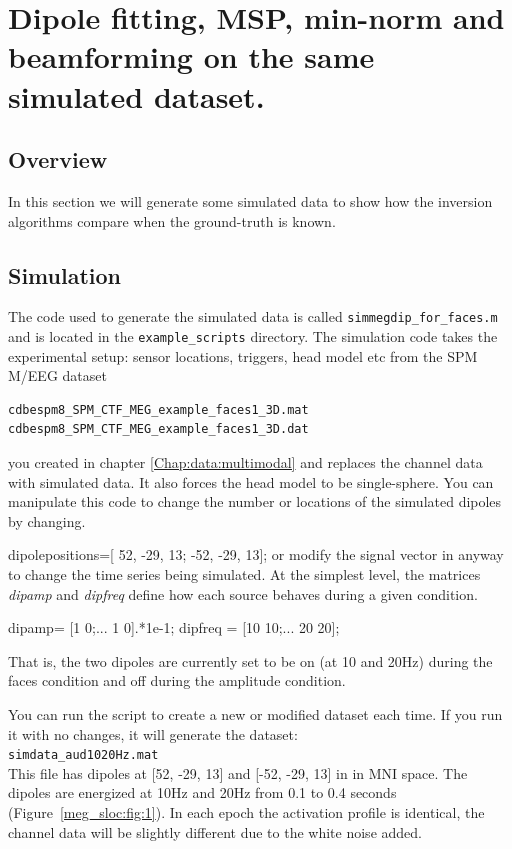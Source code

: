 \chapter{Dipole fitting, MSP, min-norm and beamforming on the same simulated dataset. \label{Chap:data:sloc}}

\section{Overview}
In this section we will generate some simulated data to show how the inversion algorithms compare when the ground-truth is known. 

\section{Simulation}
The code used to generate the simulated data is called \texttt{simmegdip_for_faces.m} and is located in the \texttt{example_scripts} directory. The simulation code takes the experimental setup: sensor locations, triggers, head model etc from the SPM M/EEG dataset

\begin{verbatim}
cdbespm8_SPM_CTF_MEG_example_faces1_3D.mat
cdbespm8_SPM_CTF_MEG_example_faces1_3D.dat
\end{verbatim}

you created in chapter \ref{Chap:data:multimodal} and replaces the channel data with simulated data. It also forces the head model to be single-sphere.
You can manipulate this code to change the number or locations of the simulated dipoles by changing.

\beginverbatim
dipolepositions=[ 52, -29, 13; -52, -29, 13]; %
\endverbatim
or modify the signal vector in anyway to change the time series being simulated. At the simplest level, the matrices \textit{dipamp} and \textit{dipfreq} define how each source behaves during a given condition. 

\beginverbatim
dipamp=	  [1 		0;...     %
           1 		0].*1e-1; %
dipfreq =	[10 		10;... 	%
         	20 		20];      %
\endverbatim

That is, the two dipoles are currently set to be on (at 10 and 20Hz) during the faces condition and off during the amplitude condition.

You can run the script to create a new or modified dataset each time. If you run it with no changes, it will generate the dataset:
\\
\texttt{simdata\_aud1020Hz.mat}
\\
This file has dipoles at [52, -29, 13] and  [-52, -29, 13] in  in MNI space. The dipoles are energized at 10Hz and 20Hz from 0.1 to 0.4 seconds (Figure~\ref{meg_sloc:fig:1}). In each epoch the activation profile is identical, the channel data will be slightly different due to the white noise added.

